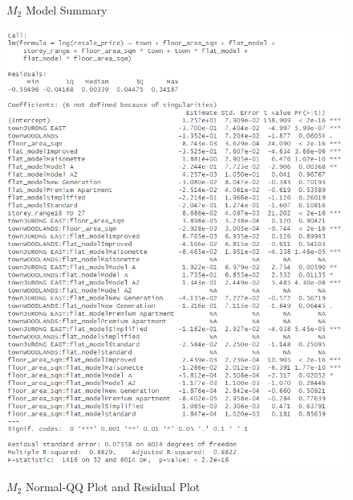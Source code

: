 \begin{figure}[!htp]
\centering
\begin{minipage}[t]{0.59\textwidth}
  \centering
    \caption{$M_2$ Model Summary}
    \includegraphics[width=\textwidth]{images2/Screenshot 2023-04-13 012323.png}
    \label{fig: m2 model summary}
\end{minipage}\hfill
\begin{minipage}[t]{0.37\textwidth}
  \centering
  \caption{$M_2$ Normal-QQ Plot and Residual Plot}

\end{minipage}
\end{figure}
